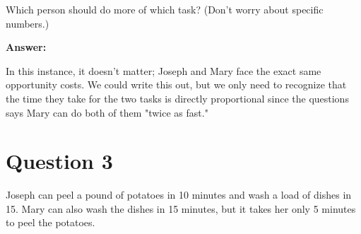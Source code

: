 \documentclass[12pt]{article}
\begin{document}
Which person should do more of which task? (Don't worry about specific numbers.)

\textbf{Answer:}

In this instance, it doesn't matter; Joseph and Mary face the exact same opportunity costs. We could write this out, but we only need to recognize that the time they take for the two tasks is directly proportional since the questions says Mary can do both of them "twice as fast."


\section*{Question 3}
Joseph can peel a pound of potatoes in 10 minutes and wash a load of dishes in 15. Mary can also wash the dishes in 15 minutes, but it takes her only 5 minutes to peel the potatoes. 
    
\end{document}
